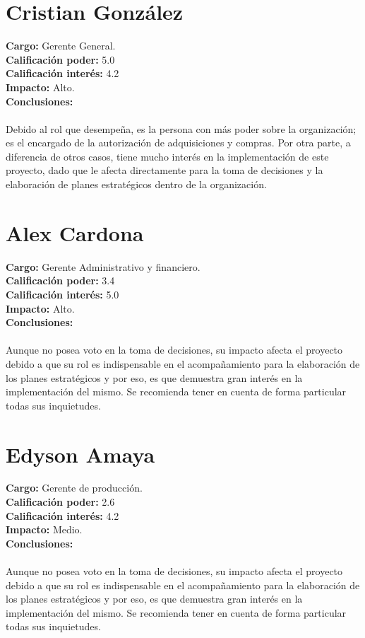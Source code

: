 \section{Cristian Gonz\'alez}
%
\noindent \textbf{Cargo:} Gerente General.\\
%
\textbf{Calificaci\'on poder:} 5.0\\
%
\textbf{Calificaci\'on inter\'es:} 4.2\\
%
\textbf{Impacto:} Alto.\\
%
\textbf{Conclusiones:}\\
%
\\Debido al rol que desempe\~na, es la persona con m\'as poder sobre la organizaci\'on; es el encargado
de la autorizaci\'on de adquisiciones y compras. Por otra parte, a diferencia de otros casos, tiene mucho 
inter\'es en la implementaci\'on de este proyecto, dado que le afecta directamente para la toma de decisiones
y la elaboraci\'on de planes estrat\'egicos dentro de la organizaci\'on.\\
%
\section{Alex Cardona}
%
\noindent \textbf{Cargo:} Gerente Administrativo y financiero.\\
%
\textbf{Calificaci\'on poder:} 3.4\\
%
\textbf{Calificaci\'on inter\'es:} 5.0\\
%
\textbf{Impacto:} Alto.\\
%
\textbf{Conclusiones:}\\
%
\\Aunque no posea voto en la toma de decisiones, su impacto afecta el proyecto debido a que su rol es indispensable
en el acompa\~namiento para la elaboraci\'on de los planes estrat\'egicos y por eso, es que demuestra gran
inter\'es en la implementaci\'on del mismo. Se recomienda tener en cuenta de forma particular todas sus 
inquietudes.\\
%
\section{Edyson Amaya}
%
\noindent \textbf{Cargo:} Gerente de producci\'on.\\
%
\textbf{Calificaci\'on poder:} 2.6\\
%
\textbf{Calificaci\'on inter\'es:} 4.2\\
%
\textbf{Impacto:} Medio.\\
%
\textbf{Conclusiones:}\\
%
\\Aunque no posea voto en la toma de decisiones, su impacto afecta el proyecto debido a que su rol es indispensable
en el acompa\~namiento para la elaboraci\'on de los planes estrat\'egicos y por eso, es que demuestra gran
inter\'es en la implementaci\'on del mismo. Se recomienda tener en cuenta de forma particular todas sus 
inquietudes.\\
%
